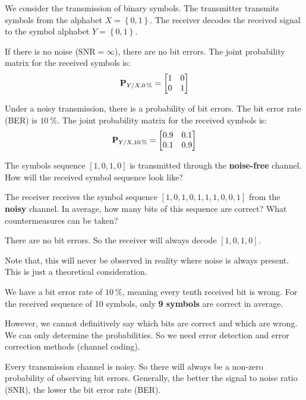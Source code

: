 \begin{question}[subtitle={Bit Errors}]
	We consider the transmission of binary symbols. The transmitter transmits symbols from the alphabet $X = \left\{0, 1\right\}$. The receiver decodes the received signal to the symbol alphabet $Y = \left\{0, 1\right\}$.
	
	If there is no noise ($\mathrm{SNR} = \infty$), there are no bit errors. The joint probability matrix for the received symbols is:
	\begin{equation*}
		\bm{\mathrm{P}}_{Y/X,\SI{0}{\percent}} = \left[\begin{matrix}
			1 & 0 \\
			0 & 1
		\end{matrix}\right]
	\end{equation*}

	Under a noisy transmission, there is a probability of bit errors. The bit error rate (BER) is $\SI{10}{\percent}$. The joint probability matrix for the received symbols is:
	\begin{equation*}
		\bm{\mathrm{P}}_{Y/X,\SI{10}{\percent}} = \left[\begin{matrix}
			0.9 & 0.1 \\
			0.1 & 0.9
		\end{matrix}\right]
	\end{equation*}
	
	\begin{tasks}
		\task
		The symbols sequence $\left[1, 0, 1, 0\right]$ is transmitted through the \textbf{noise-free} channel. How will the received symbol sequence look like?
		
		\task
		The receiver receives the symbol sequence $\left[1, 0, 1, 0, 1, 1, 1, 0, 0, 1\right]$ from the \textbf{noisy} channel. In average, how many bits of this sequence are correct? What countermeasures can be taken?
	\end{tasks}
\end{question}

\begin{solution}
	\begin{tasks}
		\task
		There are no bit errors. So the receiver will always decode $\left[1, 0, 1, 0\right]$.
		
		Note that, this will never be observed in reality where noise is always present. This is just a theoretical consideration.
		
		\task
		We have a bit error rate of $\SI{10}{\percent}$, meaning every tenth received bit is wrong. For the received sequence of 10 symbols, only \textbf{9 symbols} are correct in average.
		
		However, we cannot definitively say which bits are correct and which are wrong. We can only determine the probabilities. So we need error detection and error correction methods (channel coding).
		
		Every transmission channel is noisy. So there will always be a non-zero probability of observing bit errors. Generally, the better the signal to noise ratio (SNR), the lower the bit error rate (BER).
	\end{tasks}
\end{solution}

